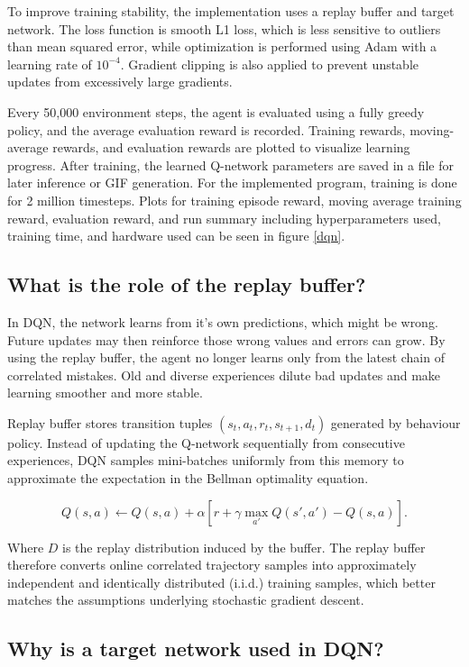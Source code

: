 \documentclass[11pt]{article}
\begin{document}
To improve training stability, the implementation uses a replay buffer and target network. The loss function is smooth L1 loss, which is less sensitive to outliers than mean squared error, while optimization is performed using Adam with a learning rate of $10^{-4}$. Gradient clipping is also applied to prevent unstable updates from excessively large gradients.

Every 50,000 environment steps, the agent is evaluated using a fully greedy policy, and the average evaluation reward is recorded. Training rewards, moving-average rewards, and evaluation rewards are plotted to visualize learning progress. After training, the learned Q-network parameters are saved in a file for later inference or GIF generation. For the implemented program, training is done for 2 million timesteps. Plots for training episode reward, moving average training reward, evaluation reward, and run summary including hyperparameters used, training time, and hardware used can be seen in figure \ref{dqn}.

\subsection*{What is the role of the replay buffer?}

In DQN, the network learns from it's own predictions, which might be wrong. Future updates may then reinforce those wrong values and errors can grow. By using the replay buffer, the agent no longer learns only from the latest chain of correlated mistakes. Old and diverse experiences dilute bad updates and make learning smoother and more stable.

Replay buffer stores transition tuples $(s_t, a_t, r_t, s_{t+1}, d_t)$ generated by behaviour policy. Instead of updating the Q-network sequentially from consecutive experiences, DQN samples mini-batches uniformly from this memory to approximate the expectation in the Bellman optimality equation.

\[
Q(s,a)\leftarrow Q(s,a) + \alpha [r + \gamma \max_{a'} Q(s',a')-Q(s,a)]
.\]

Where $D$ is the replay distribution induced by the buffer. The replay buffer therefore converts online correlated trajectory samples into approximately independent and identically distributed (i.i.d.) training samples, which better matches the assumptions underlying stochastic gradient descent.

\subsection*{Why is a target network used in DQN?}
\end{document}
